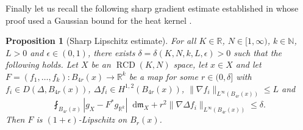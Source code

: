 \documentclass[11pt,reqno]{amsart}
\newtheorem{proposition}[theorem]{Proposition}
\theoremstyle{definition}
\numberwithin{equation}{section}
\newcommand{\di}{\mathop{}\!\mathrm{d}}
\newcommand{\meas}{\mathfrak{m}}
\DeclareMathOperator{\RCD}{RCD}
\begin{document}
Finally let us recall the following sharp gradient estimate established in \cite[Corollary 4.6]{HP} whose proof used a Gaussian bound for the heat kernel \cite{JiangLiZhang}.
\begin{proposition}[Sharp Lipschitz estimate]\label{prop:sharpgradestimate}
For all $K \in \mathbb{R}$, $N \in [1, \infty)$, $k \in \mathbb{N}$, $L>0$ and $\epsilon \in (0,1)$, there exists $\delta=\delta(K, N, k, L, \epsilon)>0$ such that the following holds.
    Let $X$ be an $\RCD(K, N)$ space, let $x \in X$ and let $F=(f_1, \ldots, f_k):B_{4r}(x) \to \mathbb{R}^k$ be a map for some $r \in (0,\delta]$ with $f_i \in D(\Delta, B_{4r}(x))$, $\Delta f_i \in H^{1,2}(B_{4r}(x))$, $\| \nabla f_i\|_{L^{\infty}(B_{4r}(x))}\le L$ and
    \begin{equation}
        \fint_{B_{4r}(x)}\left|g_X-F^*g_{\mathbb{R}^k}\right| \di \meas_X +r^2\|\nabla \Delta f_i\|_{L^{\infty}(B_{4r}(x))} \le \delta.
    \end{equation}
     Then $F$ is $(1+\epsilon)$-Lipschitz on $B_r(x)$.
\end{proposition}
\end{document}
